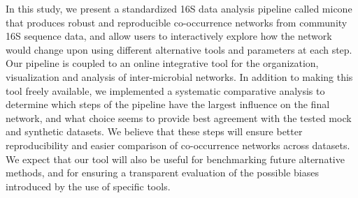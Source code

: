  In this study, we present a standardized 16S data analysis pipeline called \ac{micone} that produces robust and reproducible co-occurrence networks from community 16S sequence data, and allow users to interactively explore how the network would change upon using different alternative tools and parameters at each step.
  Our pipeline is coupled to an online integrative tool for the organization, visualization and analysis of inter-microbial networks.
  In addition to making this tool freely available, we implemented a systematic comparative analysis to determine which steps of the pipeline have the largest influence on the final network, and what choice seems to provide best agreement with the tested mock and synthetic datasets.
  We believe that these steps will ensure better reproducibility and easier comparison of co-occurrence networks across datasets.
  We expect that our tool will also be useful for benchmarking future alternative methods, and for ensuring a transparent evaluation of the possible biases introduced by the use of specific tools.
